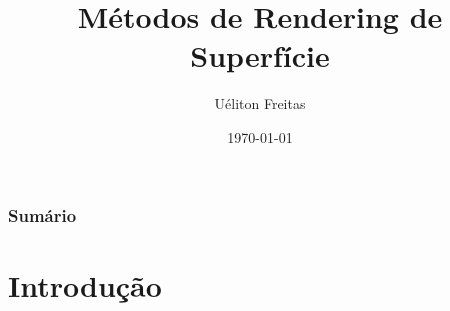 \documentclass{beamer}
\title[Computação Gráfica]{Métodos de Rendering de Superfície} %
\author{Uéliton Freitas} %
\institute[UFMS] %
{
Universidade Católica Dom Bosco - UCDB \\ %
\medskip
\textit{freitas.ueliton@gmail.com} %
}
\date{\today} %
\begin{document}
\begin{frame}
\titlepage %
\end{frame}

\begin{frame}
\frametitle{Sumário} %
\tableofcontents %
\end{frame}





\section{Introdução} 

\end{document}
